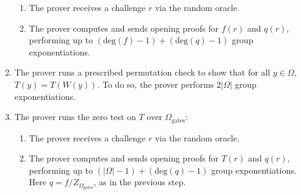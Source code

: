 \documentclass[11pt]{article}
\begin{document}
\begin{enumerate}
\begin{enumerate}
			\item The prover receives a challenge $r$ via the random oracle.
			\item The prover computes and sends opening proofs for $f(r)$ and $q(r)$,
				performing up to $(\text{deg}(f) - 1) + (\text{deg}(q) - 1)$ group exponentiations.
		\end{enumerate}
	\item The prover runs a prescribed permutation check to show that for all $y \in \Omega$, $T(y) = T(W(y))$.
		To do so, the prover performs $2|\Omega|$ group exponentiations.
	\item The prover runs the zero test on $T$ over $\Omega_{\text{gates}}$:
		\begin{enumerate}
			\item The prover receives a challenge $r$ via the random oracle.
			\item The prover computes and sends opening proofs for $T(r)$ and $q(r)$,
				performing up to $(|\Omega| - 1) + (\text{deg}(q) - 1)$ group exponentiations.
				Here $q = f / Z_{\Omega_{\text{gates}}}$, as in the previous step.
		\end{enumerate}
\end{enumerate}
\end{document}
